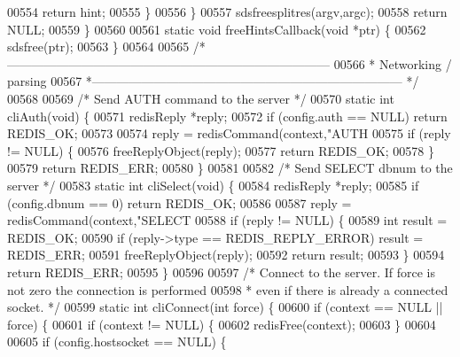 \begin{DoxyCode}
{{{{{{{{{{{{00554             \textcolor{keywordflow}{return} hint;
00555         \}
00556     \}
00557     sdsfreesplitres(argv,argc);
00558     \textcolor{keywordflow}{return} NULL;
00559 \}
00560 
00561 \textcolor{keyword}{static} \textcolor{keywordtype}{void} freeHintsCallback(\textcolor{keywordtype}{void} *ptr) \{
00562     sdsfree(ptr);
00563 \}
00564 
00565 \textcolor{comment}{/*------------------------------------------------------------------------------}
00566 \textcolor{comment}{ * Networking / parsing}
00567 \textcolor{comment}{ *--------------------------------------------------------------------------- */}
00568 
00569 \textcolor{comment}{/* Send AUTH command to the server */}
00570 \textcolor{keyword}{static} \textcolor{keywordtype}{int} cliAuth(\textcolor{keywordtype}{void}) \{
00571     redisReply *reply;
00572     \textcolor{keywordflow}{if} (config.auth == NULL) \textcolor{keywordflow}{return} REDIS\_OK;
00573 
00574     reply = redisCommand(context,\textcolor{stringliteral}{"AUTH %
00575     \textcolor{keywordflow}{if} (reply != NULL) \{
00576         freeReplyObject(reply);
00577         \textcolor{keywordflow}{return} REDIS\_OK;
00578     \}
00579     \textcolor{keywordflow}{return} REDIS\_ERR;
00580 \}
00581 
00582 \textcolor{comment}{/* Send SELECT dbnum to the server */}
00583 \textcolor{keyword}{static} \textcolor{keywordtype}{int} cliSelect(\textcolor{keywordtype}{void}) \{
00584     redisReply *reply;
00585     \textcolor{keywordflow}{if} (config.dbnum == 0) \textcolor{keywordflow}{return} REDIS\_OK;
00586 
00587     reply = redisCommand(context,\textcolor{stringliteral}{"SELECT %
00588     \textcolor{keywordflow}{if} (reply != NULL) \{
00589         \textcolor{keywordtype}{int} result = REDIS\_OK;
00590         \textcolor{keywordflow}{if} (reply->type == REDIS\_REPLY\_ERROR) result = REDIS\_ERR;
00591         freeReplyObject(reply);
00592         \textcolor{keywordflow}{return} result;
00593     \}
00594     \textcolor{keywordflow}{return} REDIS\_ERR;
00595 \}
00596 
00597 \textcolor{comment}{/* Connect to the server. If force is not zero the connection is performed}
00598 \textcolor{comment}{ * even if there is already a connected socket. */}
00599 \textcolor{keyword}{static} \textcolor{keywordtype}{int} cliConnect(\textcolor{keywordtype}{int} force) \{
00600     \textcolor{keywordflow}{if} (context == NULL || force) \{
00601         \textcolor{keywordflow}{if} (context != NULL) \{
00602             redisFree(context);
00603         \}
00604 
00605         \textcolor{keywordflow}{if} (config.hostsocket == NULL) \{
}}}}}}}}}}}}}}
\end{DoxyCode}
